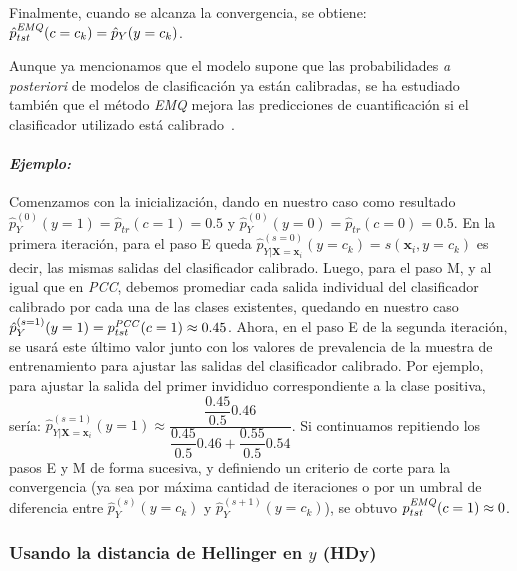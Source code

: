 Finalmente, cuando se alcanza la convergencia, se obtiene: $\hat p^{\it EMQ
\/}_{tst}(c=c_k) = \hat p_{Y}(y=c_k)$.

Aunque ya mencionamos que el modelo supone que las probabilidades {\it a
posteriori\/} de modelos de clasificación ya están calibradas, se ha estudiado
también que el método {\it EMQ\/} mejora las predicciones de cuantificación si
el clasificador utilizado está calibrado~\cite{esuli2020critical,
alexandari2020maximum}.

\paragraph{\it Ejemplo:\/} Comenzamos con la inicialización, dando en nuestro
caso como resultado $\hat p^{(0)}_{Y}(y=1) = \hat p_{tr}(c=1) = 0.5$ y $\hat
p^{(0)}_{Y}(y=0) = \hat p_{tr}(c=0) = 0.5$. En la primera iteración, para el
paso E queda $\hat p^{(s=0)}_{Y|\boldsymbol{X}=\boldsymbol{x}_i}(y=c_k) =
s(\boldsymbol{x}_i, y=c_k)$ es decir, las mismas salidas del clasificador
calibrado. Luego, para el paso M, y al igual que en {\it PCC}, debemos promediar
cada salida individual del clasificador calibrado por cada una de las clases
existentes, quedando en nuestro caso $\hat p^{(s=1)}_{Y}(y=1) = p^{\it
PCC\/}_{tst}(c=1) \approx 0.45$. Ahora, en el paso E de la segunda iteración, se
usará este último valor junto con los valores de prevalencia de la muestra de
entrenamiento para ajustar las salidas del clasificador calibrado. Por ejemplo,
para ajustar la salida del primer invididuo correspondiente a la clase positiva,
sería: $\hat p^{(s=1)}_{Y|\boldsymbol{X}=\boldsymbol{x}_i}(y=1) \approx
\dfrac{\dfrac{0.45}{0.5}0.46}{\dfrac{0.45}{0.5}0.46+\dfrac{0.55}{0.5}0.54}$. Si
continuamos repitiendo los pasos E y M de forma sucesiva, y definiendo un
criterio de corte para la convergencia (ya sea por máxima cantidad de
iteraciones o por un umbral de diferencia entre $\hat p^{(s)}_{Y}(y=c_k)$ y
$\hat p^{(s+1)}_{Y}(y=c_k)$), se obtuvo $p^{\it EMQ \/}_{tst}(c=1) \approx 0$.

\subsubsection{Usando la distancia de Hellinger en $y$ (HDy)}\label{puntual:hdy}

